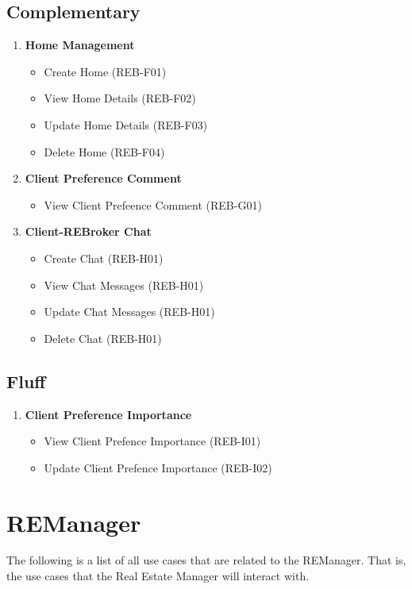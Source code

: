 \documentclass[11pt]{article}
\begin{document}
		\subsection{Complementary}
		\begin{enumerate}[i]
			\item \textbf{Home Management}
			\begin{itemize}
				\item Create Home (REB-F01)
				\item View Home Details (REB-F02)
				\item Update Home Details (REB-F03)
				\item Delete Home (REB-F04)
			\end{itemize}
			
			\item \textbf{Client Preference Comment}
			\begin{itemize}
				\item View Client Prefeence Comment (REB-G01)
			\end{itemize}
			
			\item \textbf{Client-REBroker Chat}
			\begin{itemize}
				\item Create Chat (REB-H01)
				\item View Chat Messages (REB-H01)
				\item Update Chat Messages (REB-H01)
				\item Delete Chat (REB-H01)
			\end{itemize}
		\end{enumerate}
		
		\subsection{Fluff}
		\begin{enumerate}[i]
			\item \textbf{Client Preference Importance}
			\begin{itemize}
				\item View Client Prefence Importance (REB-I01)
				\item Update Client Prefence Importance (REB-I02)
			\end{itemize}
		\end{enumerate}
	
	\section{REManager}
	\begin{flushleft}
		The following is a list of all use cases that are related to the REManager. That is, the use cases that the Real Estate Manager will interact with.
	\end{flushleft}
	
\end{document}
